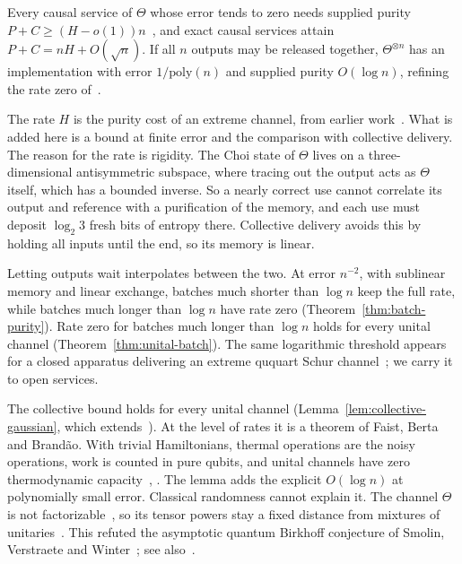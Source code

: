 \begin{introthm}\label{thm:intro-qutrit}
Every causal service of $\Theta$ whose error tends to zero needs
supplied purity $P+C\geq(H-o(1))n$~\cite[Theorem~3.2(c) and Proposition~F.1(c)]{DouglasMghirbiB}, and exact causal
services attain $P+C=nH+O(\sqrt n)$. If all $n$ outputs may be released
together, $\Theta^{\otimes n}$ has an implementation with error
$1/\mathrm{poly}(n)$ and supplied purity $O(\log n)$, refining the rate
zero of~\cite{FaistBertaBrandao2019}.
\end{introthm}

The rate $H$ is the purity cost of an extreme channel, from earlier
work~\cite{DouglasMghirbiB}. What is added here is a bound at finite
error and the comparison with collective delivery. The reason for the
rate is rigidity. The Choi state of $\Theta$ lives on a
three-dimensional antisymmetric subspace, where tracing out the output
acts as $\Theta$ itself, which has a bounded inverse. So a nearly correct
use cannot correlate its output and reference with a purification of
the memory, and each use must deposit $\log_2 3$ fresh bits of entropy
there. Collective delivery avoids this by holding all inputs until the
end, so its memory is linear.

Letting outputs wait interpolates between the two. At error $n^{-2}$,
with sublinear memory and linear exchange, batches much shorter than
$\log n$ keep the full rate, while batches much longer than $\log n$
have rate zero (Theorem~\ref{thm:batch-purity}). Rate zero for batches
much longer than $\log n$ holds for every unital channel
(Theorem~\ref{thm:unital-batch}). The same logarithmic threshold appears
for a closed apparatus delivering an extreme ququart Schur
channel~\cite[Theorems~7 and~8]{DouglasSchur}; we carry it to open
services.

The collective bound holds for every unital channel
(Lemma~\ref{lem:collective-gaussian}, which
extends~\cite[Theorem~1]{DouglasSchur}). At the level of rates it is a
theorem of Faist, Berta and Brand\~ao. With trivial Hamiltonians,
thermal operations are the noisy operations, work is counted in pure
qubits, and unital channels have zero thermodynamic
capacity~\cite{FaistBertaBrandao2019},
\cite[Equation~(4.9) and Theorem~7.1]{FaistBertaBrandao2021}. The lemma
adds the explicit $O(\log n)$ at polynomially small error. Classical
randomness cannot explain it. The channel $\Theta$ is not
factorizable~\cite[Example~3.1]{HaagerupMusat2011}, so its tensor powers
stay a fixed distance from mixtures of
unitaries~\cite[Section~6]{HaagerupMusat2011}. This refuted the
asymptotic quantum Birkhoff conjecture of Smolin, Verstraete and
Winter~\cite{SmolinVerstraeteWinter2005}; see also~\cite{Shor2010}.

